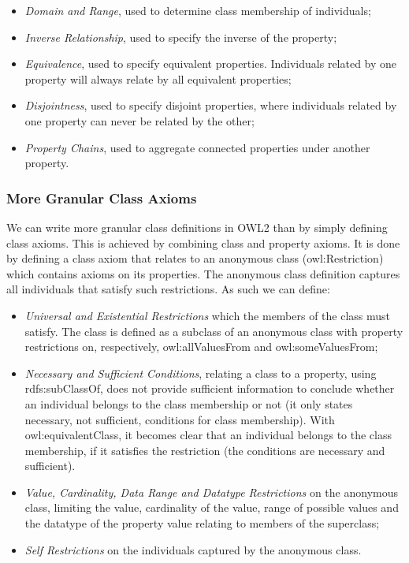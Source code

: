\begin{itemize}
    \item \emph{Domain and Range}, used to determine class membership of individuals;
    \item \emph{Inverse Relationship}, used to specify the inverse of the property;
    \item \emph{Equivalence}, used to specify equivalent properties. Individuals related by one property will always relate by all equivalent properties;
    \item \emph{Disjointness}, used to specify disjoint properties, where individuals related by one property can never be related by the other;
    \item \emph{Property Chains}, used to aggregate connected properties under another property.
\end{itemize}
 

\subsubsection*{More Granular Class Axioms}

We can write more granular class definitions in \gls{OWL2} than by simply defining class axioms. This is achieved by combining class and property axioms. It is done by defining a class axiom that relates to an anonymous class (owl:Restriction) which contains axioms on its properties. The anonymous class definition captures all individuals that satisfy such restrictions. As such we can define:
\begin{itemize}
    \item \emph{Universal and Existential Restrictions} which the members of the class must satisfy. The class is defined as a subclass of an anonymous class with property restrictions on, respectively, owl:allValuesFrom and owl:someValuesFrom;      
    \item \emph{Necessary and Sufficient Conditions}, relating a class to a property, using rdfs:subClass\-Of, does not provide sufficient information to conclude whether an individual belongs to the class membership or not (it only states necessary, not sufficient, conditions for class membership). With owl:equivalentClass, it becomes clear that an individual belongs to the class membership, if it satisfies the restriction (the conditions are necessary and sufficient).
    \item \emph{Value, Cardinality, Data Range and Datatype Restrictions} on the anonymous class, limiting the value, cardinality of the value, range of possible values and the datatype of the property value relating to members of the superclass; 
    \item \emph{Self Restrictions} on the individuals captured by the anonymous class.

\end{itemize}

